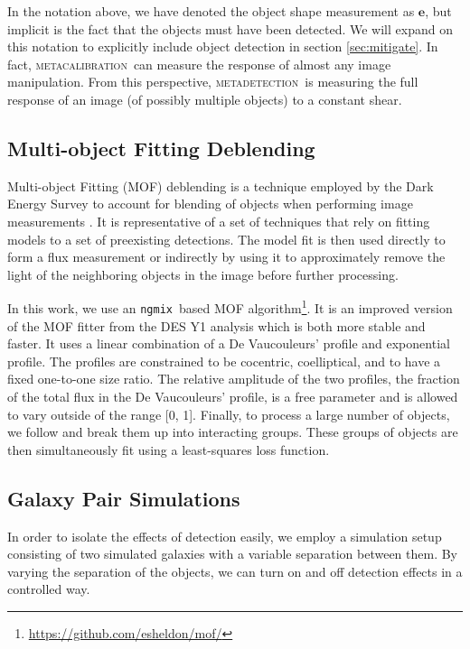 \documentclass[fleqn,useAMS,usenatbib]{mnras}
\newcommand{\ngmix}{\texttt{ngmix}}
\newcommand{\mcal}{\textsc{metacalibration}}
\newcommand{\mdet}{\textsc{metadetection}}
\begin{document}
In the notation above, we have denoted the object shape measurement as
$\boldsymbol{e}$, but implicit is the fact that the objects must have been
detected.  We will expand on this notation to explicitly include object
detection in section \ref{sec:mitigate}.  In fact, \mcal\ can measure the
response of almost any image manipulation. From this perspective, \mdet\ is
measuring the full response of an image (of possibly multiple objects) to a
constant shear.


\subsection{Multi-object Fitting Deblending}

Multi-object Fitting (MOF) deblending is a technique employed by the Dark
Energy Survey to account for blending of objects when performing image
measurements \citep{DESY1cat}. It is representative of a set of techniques that
rely on fitting models to a set of preexisting detections. The model fit is
then used directly to form a flux measurement or indirectly by using it to
approximately remove the light of the neighboring objects in the image before
further processing.

In this work, we use an \ngmix\ based MOF
algorithm\footnote{\url{https://github.com/esheldon/mof/}}. It is an improved
version of the MOF fitter from the DES Y1 analysis which is both more stable
and faster. It uses a linear combination of a De Vaucouleurs'
\citep{devauc1948} profile and exponential profile. The profiles are
constrained to be cocentric, coelliptical, and to have a fixed one-to-one size
ratio.  The relative amplitude of the two profiles, the fraction of the total
flux in the De Vaucouleurs' profile, is a free parameter and is allowed to vary
outside of the range [0, 1]. Finally, to process a large number of objects, we
follow \citet{DESY1cat} and break them up into interacting groups.  These
groups of objects are then simultaneously fit using a least-squares loss
function.

\subsection{Galaxy Pair Simulations}
\label{sec:sims:pairs}

In order to isolate the effects of detection easily, we employ a simulation setup
consisting of two simulated galaxies with a variable separation between them. By
varying the separation of the objects, we can turn on and off detection effects
in a controlled way.
\end{document}
